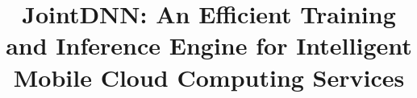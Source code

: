 \documentclass[sigconf]{acmart}
\begin{document}
\title{JointDNN: An Efficient Training and Inference Engine for Intelligent Mobile Cloud Computing Services}






\maketitle












\end{document}
